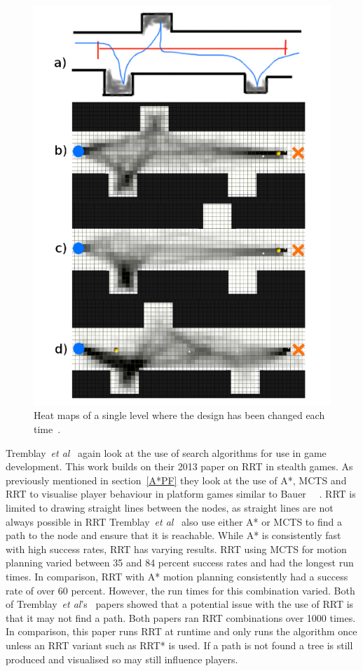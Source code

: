 \documentclass[journal]{IEEEtran}
\begin{document}
	\begin{figure}[h]
		\includegraphics[width=1.0\linewidth]{TremblayHeatMap.png}
		\caption{Heat maps of a single level where the design has been changed each time~\cite{Tremblay2013}.}
		\label{TremblayHeatMap}
	\end{figure} 
	
	Tremblay~\textit{et al}~\cite{Tremblay2014} again look at the use of search algorithms for use in game development. This work builds on their 2013 paper on RRT in stealth games. As previously mentioned in section~\ref{A*PF} they look at the use of A*, MCTS and RRT to visualise player behaviour in platform games similar to Bauer ~\cite{Tremblay2014}~\cite{bauer2012}.  RRT is limited to drawing straight lines between the nodes, as straight lines are not always possible in RRT Tremblay~\textit{et al}~\cite{Tremblay2014} also use either A* or MCTS to find a path to the node and ensure that it is reachable.
	While A* is consistently fast with high success rates, RRT has varying results. RRT using MCTS for motion planning varied between 35 and 84 percent success rates and had the longest run times. In comparison, RRT with A* motion planning consistently had a success rate of over 60 percent. However, the run times for this combination varied. 
	Both of Tremblay~\textit{et al}'s~\cite{Tremblay2014, Tremblay2013} papers showed that a potential issue with the use of RRT is that it may not find a path. Both papers ran RRT combinations over 1000 times. In comparison, this paper runs RRT at runtime and only runs the algorithm once unless an RRT variant such as RRT* is used. If a path is not found a tree is still produced and visualised so may still influence players.
	
\end{document}

